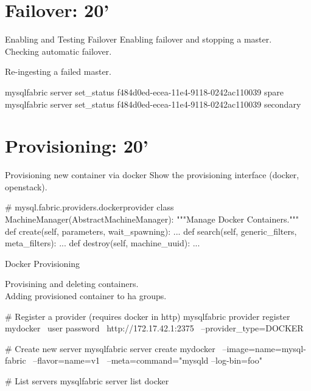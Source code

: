 \documentclass{beamer}[10]
\begin{document}
\section{Failover: 20'}
\begin{pyframe}{Enabling and Testing Failover}
Enabling failover and stopping a master. \\

Checking automatic failover. \\

Re-ingesting a failed master. \\
\begin{bashcode}
mysqlfabric server set_status  f484d0ed-ecea-11e4-9118-0242ac110039  spare
mysqlfabric server set_status  f484d0ed-ecea-11e4-9118-0242ac110039  secondary
\end{bashcode}
\end{pyframe}


\section{Provisioning: 20'}
\begin{pyframe}{Provisioning new container via docker}
Show the provisioning interface (docker, openstack). \\

\begin{pycode}
# mysql.fabric.providers.dockerprovider
class MachineManager(AbstractMachineManager):
    """Manage Docker Containers."""
    def create(self, parameters, wait_spawning):
        ...
    def search(self, generic_filters, meta_filters):
        ...
    def destroy(self, machine_uuid):
        ...
\end{pycode}
\end{pyframe}


\begin{pyframe}{Docker Provisioning}

Provisining and deleting containers. \\

Adding provisioned container to ha groups. \\

\begin{bashcode}
# Register a provider (requires docker in http)
mysqlfabric provider register mydocker \
    user password \
    http://172.17.42.1:2375  \
    --provider_type=DOCKER

# Create new server
mysqlfabric server create mydocker \
    --image=name=mysql-fabric   \
    --flavor=name=v1            \
    --meta=command="mysqld --log-bin=foo"

# List servers
mysqlfabric server list docker
\end{bashcode}
\end{pyframe}
\end{document}
